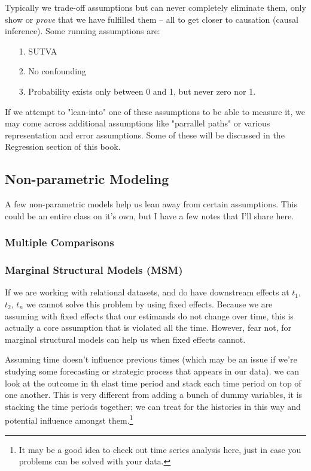 \documentclass[12pt]{article}\usepackage[]{graphicx}\usepackage[]{color}
\begin{document}
\begin{flushleft}

Typically we trade-off assumptions but can never completely eliminate them, only show or \textit{prove} that we have fulfilled them -- all to get closer to causation (causal inference). Some running assumptions are:

\begin{itemize}
\item[1.] SUTVA
\item[2.] No confounding
\item[3.] Probability exists only between 0 and 1, but never zero nor 1.
\end{itemize}

\noindent If we attempt to "lean-into" one of these assumptions to be able to measure it, we may come across additional assumptions like "parrallel paths" or various representation and error assumptions. Some of these will be discussed in the Regression section of this book.


\subsection{Non-parametric Modeling}

A few non-parametric models help us lean away from certain assumptions. This could be an entire class on it's own, but I have a few notes that I'll share here.


\subsubsection{Multiple Comparisons}


\subsubsection{Marginal Structural Models (MSM)}

If we are working with relational datasets, and do have downstream effects at $t_1$, $t_2$, $t_n$ we cannot solve this problem by using fixed effects. Because we are assuming with fixed effects that our estimands do not change over time, this is actually a core assumption that is violated all the time. However, fear not, for marginal structural models can help us when fixed effects cannot.

Assuming time doesn't influence previous times (which may be an issue if we're studying some forecasting or strategic process that appears in our data). we can look at the outcome in th elast time period and stack each time period on top of one another. This is very different from adding a bunch of dummy variables, it is stacking the time periods together; we can treat for the histories in this way and potential influence amongst them.\footnote{It may be a good idea to check out time series analysis here, just in case you problems can be solved with your data.}


\end{flushleft}
\end{document}
